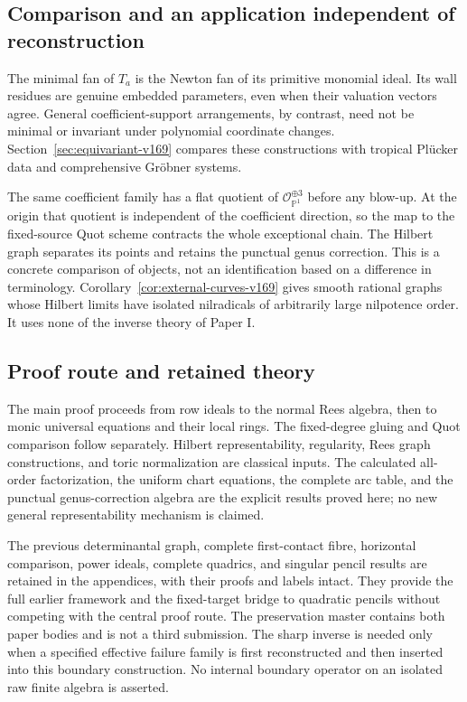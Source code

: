 \documentclass[11pt,reqno]{amsart}
\numberwithin{equation}{section}
\theoremstyle{definition}\newtheorem{definition}[theorem]{Definition}
\theoremstyle{remark}\newtheorem{remark}[theorem]{Remark}
\newcommand{\Pj}{\mathbb P}\newcommand{\A}{\mathbb A}
\newcommand{\OO}{\mathcal O}\newcommand{\II}{\mathcal I}
\begin{document}
\subsection{Comparison and an application independent of reconstruction}
The minimal fan of $T_a$ is the Newton fan of its primitive monomial
ideal. Its wall residues are genuine embedded parameters, even when
their valuation vectors agree. General coefficient-support
arrangements, by contrast, need not be minimal or invariant under
polynomial coordinate changes. Section~\ref{sec:equivariant-v169}
compares these constructions with tropical Pl\"ucker data and
comprehensive Gr\"obner systems.

The same coefficient family has a flat quotient of
$\OO_{\Pj^1}^{\oplus3}$ before any blow-up. At the origin that quotient
is independent of the coefficient direction, so the map to the
fixed-source Quot scheme contracts the whole exceptional chain.
The Hilbert graph separates its points and retains the punctual genus
correction. This is a concrete comparison of objects, not an
identification based on a difference in terminology.
Corollary~\ref{cor:external-curves-v169} gives smooth rational graphs
whose Hilbert limits have isolated nilradicals of arbitrarily large
nilpotence order. It uses none of the inverse theory of Paper I.

\subsection{Proof route and retained theory}
The main proof proceeds from row ideals to the normal Rees algebra,
then to monic universal equations and their local rings. The
fixed-degree gluing and Quot comparison follow separately. Hilbert
representability, regularity, Rees graph constructions, and toric
normalization are classical inputs. The calculated all-order
factorization, the uniform chart equations, the complete arc table,
and the punctual genus-correction algebra are the explicit results
proved here; no new general representability mechanism is claimed.

The previous determinantal graph, complete first-contact fibre,
horizontal comparison, power ideals, complete quadrics, and singular
pencil results are retained in the appendices, with their proofs and
labels intact. They provide the full earlier framework and the
fixed-target bridge to quadratic pencils without competing with the
central proof route. The preservation master contains both paper
bodies and is not a third submission. The sharp inverse is needed
only when a specified effective failure family is first reconstructed
and then inserted into this boundary construction. No internal
boundary operator on an isolated raw finite algebra is asserted.
\end{document}
